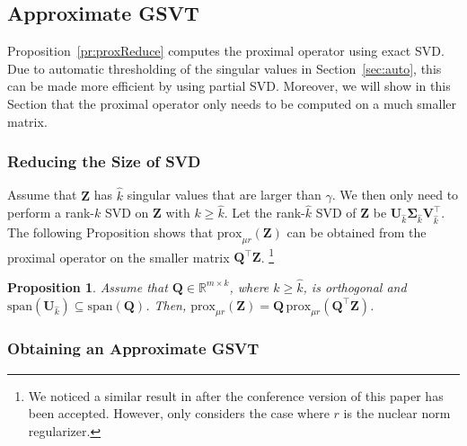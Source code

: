\documentclass[10pt,journal,compsoc]{IEEEtran}
\newtheorem{prop}[theorem]{Proposition}
\def \R{\mathbb R}
\newcommand{\Prox}[2]{\text{prox}_{#1}(#2)}
\newcommand{\Span}[1]{\text{span}(#1)}
\begin{document}

\subsection{Approximate GSVT}
\label{sec:apprSVT}

Proposition~\ref{pr:proxReduce} computes the proximal operator using exact SVD.
Due to automatic thresholding of the singular values
in Section~\ref{sec:auto},
this can be made more efficient by using
	partial SVD.
Moreover,  we will show in this Section that
the proximal operator only needs to be 
computed
on a much smaller matrix.


\subsubsection{Reducing the Size of SVD}

Assume that $\mathbf{Z}$ has $\hat{k}$ singular values that are larger than $\gamma$.
We 
then
only need to perform a rank-$k$ SVD on $\mathbf{Z}$ with $k \ge \hat{k}$.
Let the rank-$\hat{k}$ SVD of $\mathbf{Z}$ be $\mathbf{U}_{\hat{k}} \mathbf{\Sigma}_{\hat{k}} \mathbf{V}_{\hat{k}}^{\top}$.
The following Proposition shows that 
$\Prox{\mu r}{\mathbf{Z}}$
can be obtained from the proximal operator on the smaller matrix
$\mathbf{Q}^{\top} \mathbf{Z}$.
\footnote{We noticed a similar result in \cite{oh2018pami} after the conference version of this paper \cite{yao2015fast} has been accepted.  However, \cite{oh2018pami} only considers the case where $r$ is the nuclear norm regularizer.}


\begin{prop} \label{pr:redGSVT} 
Assume that $\mathbf{Q} \in \R^{m \times k}$, where $k \ge \hat{k}$, is orthogonal and
$\Span{\mathbf{U}_{\hat{k}}} \subseteq \Span{\mathbf{Q}}$.
Then,
$\Prox{\mu r}{\mathbf{Z}} = \mathbf{Q} \, \Prox{\mu r}{\mathbf{Q}^{\top} \mathbf{Z}}$.
\end{prop}


\subsubsection{Obtaining an Approximate GSVT}
\label{sec:apprgsvt}
\end{document}
